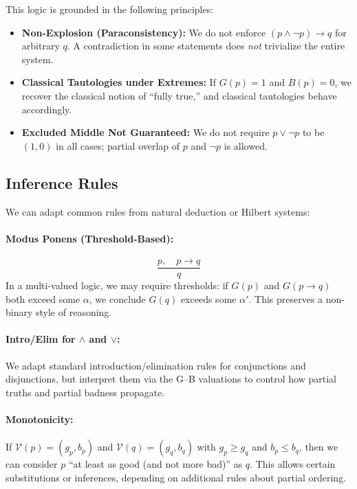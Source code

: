 \documentclass[11pt]{article}
\begin{document}
This logic is grounded in the following principles:

\begin{itemize}
    \item \textbf{Non-Explosion (Paraconsistency):} We do not enforce \((p \land \lnot p) \to q\) 
    for arbitrary \(q\). A contradiction in some statements does \emph{not} trivialize the entire system.
    \item \textbf{Classical Tautologies under Extremes:} If \(G(p)=1\) and \(B(p)=0\), we recover 
    the classical notion of ``fully true,'' and classical tautologies behave accordingly.
    \item \textbf{Excluded Middle Not Guaranteed:} We do not require \(p \lor \lnot p\) to be 
    \((1,0)\) in all cases; partial overlap of \(p\) and \(\lnot p\) is allowed.
\end{itemize}

\subsection{Inference Rules}

We can adapt common rules from natural deduction or Hilbert systems:

\paragraph{Modus Ponens (Threshold-Based):}
\[
  \frac{p,\quad p \to q}{q}
\]
In a multi-valued logic, we may require thresholds:
if \(G(p)\) and \(G(p \to q)\) both exceed some \(\alpha\), we conclude \(G(q)\) exceeds some 
\(\alpha'\). This preserves a non-binary style of reasoning.

\paragraph{Intro/Elim for \(\land\) and \(\lor\):}
We adapt standard introduction/elimination rules for conjunctions and disjunctions, 
but interpret them via the G--B valuations to control how partial truths and partial 
badness propagate.

\paragraph{Monotonicity:}
If \(\mathcal{V}(p)=(g_p,b_p)\) and \(\mathcal{V}(q)=(g_q,b_q)\) with 
\(g_p \ge g_q\) and \(b_p \le b_q\), then we can consider \(p\) 
``at least as good (and not more bad)'' as \(q\). This allows certain 
substitutions or inferences, depending on additional rules about partial ordering.
\end{document}
